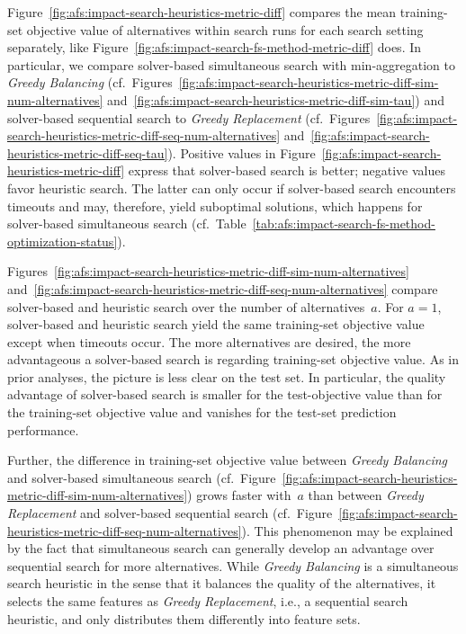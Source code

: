 \documentclass{article}
\theoremstyle{definition}
\begin{document}
Figure~\ref{fig:afs:impact-search-heuristics-metric-diff} compares the mean training-set objective value of alternatives within search runs for each search setting separately, like Figure~\ref{fig:afs:impact-search-fs-method-metric-diff} does.
In particular, we compare solver-based simultaneous search with min-aggregation to \emph{Greedy Balancing} (cf.~Figures~\ref{fig:afs:impact-search-heuristics-metric-diff-sim-num-alternatives} and~\ref{fig:afs:impact-search-heuristics-metric-diff-sim-tau}) and solver-based sequential search to \emph{Greedy Replacement} (cf.~Figures~\ref{fig:afs:impact-search-heuristics-metric-diff-seq-num-alternatives} and~\ref{fig:afs:impact-search-heuristics-metric-diff-seq-tau}).
Positive values in Figure~\ref{fig:afs:impact-search-heuristics-metric-diff} express that solver-based search is better; negative values favor heuristic search.
The latter can only occur if solver-based search encounters timeouts and may, therefore, yield suboptimal solutions, which happens for solver-based simultaneous search (cf.~Table~\ref{tab:afs:impact-search-fs-method-optimization-status}).

Figures~\ref{fig:afs:impact-search-heuristics-metric-diff-sim-num-alternatives} and~\ref{fig:afs:impact-search-heuristics-metric-diff-seq-num-alternatives} compare solver-based and heuristic search over the number of alternatives~$a$.
For $a=1$, solver-based and heuristic search yield the same training-set objective value except when timeouts occur.
The more alternatives are desired, the more advantageous a solver-based search is regarding training-set objective value.
As in prior analyses, the picture is less clear on the test set.
In particular, the quality advantage of solver-based search is smaller for the test-objective value than for the training-set objective value and vanishes for the test-set prediction performance.

Further, the difference in training-set objective value between \emph{Greedy Balancing} and solver-based simultaneous search (cf.~Figure~\ref{fig:afs:impact-search-heuristics-metric-diff-sim-num-alternatives}) grows faster with~$a$ than between \emph{Greedy Replacement} and solver-based sequential search (cf.~Figure~\ref{fig:afs:impact-search-heuristics-metric-diff-seq-num-alternatives}).
This phenomenon may be explained by the fact that simultaneous search can generally develop an advantage over sequential search for more alternatives.
While \emph{Greedy Balancing} is a simultaneous search heuristic in the sense that it balances the quality of the alternatives, it selects the same features as \emph{Greedy Replacement}, i.e., a sequential search heuristic, and only distributes them differently into feature sets.
\end{document}
